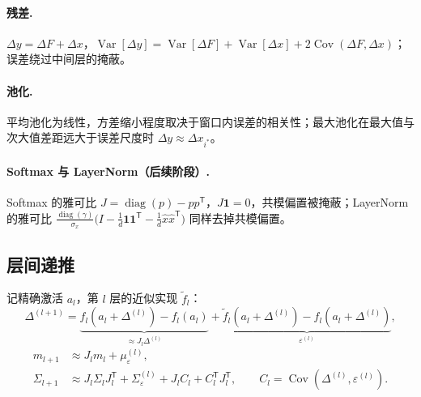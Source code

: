 \documentclass[11pt,a4paper]{ctexart}
\DeclareMathOperator{\Var}{Var}
\DeclareMathOperator{\Cov}{Cov}
\begin{document}
\paragraph{残差.} $\Delta y = \Delta F + \Delta x$，$\Var[\Delta y] = \Var[\Delta F] + \Var[\Delta x] + 2\Cov(\Delta F,\Delta x)$；误差绕过中间层的掩蔽。

\paragraph{池化.} 平均池化为线性，方差缩小程度取决于窗口内误差的相关性；最大池化在最大值与次大值差距远大于误差尺度时 $\Delta y \approx \Delta x_{i^*}$。

\paragraph{Softmax 与 LayerNorm（后续阶段）.} Softmax 的雅可比 $J = \operatorname{diag}(p) - pp^{\mathsf T}$，$J\mathbf 1 = 0$，共模偏置被掩蔽；LayerNorm 的雅可比 $\frac{\operatorname{diag}(\gamma)}{\sigma_x}\bigl(I - \frac1d\mathbf 1\mathbf 1^{\mathsf T} - \frac1d\hat x\hat x^{\mathsf T}\bigr)$ 同样去掉共模偏置。

\subsection{层间递推}
\label{sec:recursion}
记精确激活 $a_l$，第 $l$ 层的近似实现 $\tilde f_l$：
\begin{equation}
\Delta^{(l+1)} = \underbrace{f_l(a_l+\Delta^{(l)}) - f_l(a_l)}_{\approx J_l\Delta^{(l)}} + \underbrace{\tilde f_l(a_l+\Delta^{(l)}) - f_l(a_l+\Delta^{(l)})}_{\varepsilon^{(l)}},
\end{equation}
\begin{align}
m_{l+1} &\approx J_l m_l + \mu_\varepsilon^{(l)},\\
\Sigma_{l+1} &\approx J_l\Sigma_l J_l^{\mathsf T} + \Sigma_\varepsilon^{(l)} + J_l C_l + C_l^{\mathsf T}J_l^{\mathsf T},\qquad C_l = \Cov(\Delta^{(l)},\varepsilon^{(l)}).
\end{align}
\end{document}
